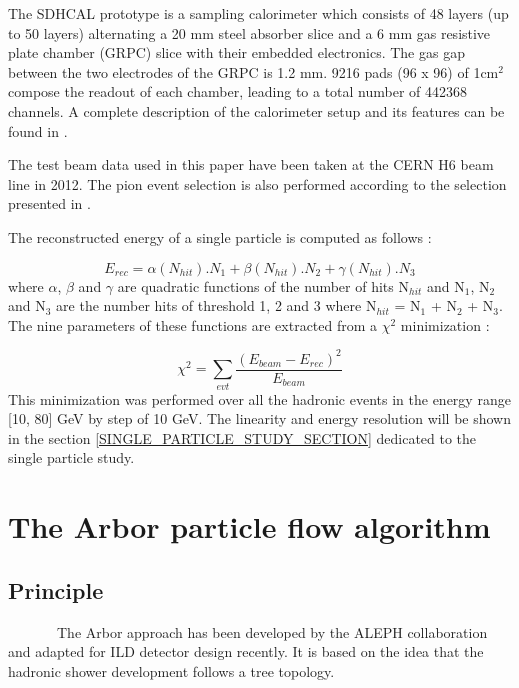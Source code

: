 \documentclass[cits]{JINST}
\begin{document}
The SDHCAL prototype is a sampling calorimeter which consists of 48 layers (up to 50 layers) alternating a 20 mm steel absorber slice and a 6 mm gas resistive plate chamber (GRPC) slice with their embedded electronics. The gas gap between the two electrodes of the GRPC is 1.2 mm. 9216 pads (96 x 96) of 1cm$^2$ compose the readout of each chamber, leading to a total number of 442368 channels. A complete description of the calorimeter setup and its features can be found in \cite{sdhcal-paper}. 

The test beam data used in this paper have been taken at the CERN H6 beam line in 2012. The pion event selection is also performed according to the selection presented in \cite{sdhcal-paper}.

The reconstructed energy of a single particle is computed as follows :

\begin{equation}
  E_{rec} = \alpha(N_{hit}).N_{1}
          + \beta(N_{hit}) .N_{2}
          + \gamma(N_{hit}).N_{3}   
\end{equation}
where $\alpha$, $\beta$ and $\gamma$ are quadratic functions of the number of hits N$_{hit}$ and N$_1$, N$_2$ and N$_3$ are the number hits of threshold 1, 2 and 3 where N$_{hit}$ = N$_1$ + N$_2$ + N$_3$. The nine parameters of these functions are extracted from a $\chi^2$ minimization :

\begin{equation}
  \chi^2 = \sum\limits_{evt} \frac{(E_{beam} - E_{rec})^2}{E_{beam}}
\end{equation}
This minimization was performed over all the hadronic events in the energy range [10, 80] GeV by step of 10 GeV. The linearity and energy resolution will be shown in the section \ref{SINGLE_PARTICLE_STUDY_SECTION} dedicated to the single particle study.

\newpage
\section{The Arbor particle flow algorithm}

\subsection{Principle} 

~~~~~~~The Arbor approach has been developed by the ALEPH collaboration and adapted \cite{arbor-manqi} for ILD detector design recently. It is based on the idea that the hadronic shower development follows a tree topology.
\end{document}

